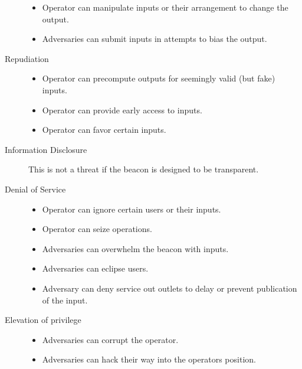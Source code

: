 \begin{description}
    \begin{itemize}
                                    \item Operator can manipulate inputs or their arrangement to change the output.
                                    \item Adversaries can submit inputs in attempts to bias the output.
                                \end{itemize}
    \item [Repudiation] \begin{itemize}
                            \item Operator can precompute outputs for seemingly valid (but fake) inputs.
                            \item Operator can provide early access to inputs.
                            \item Operator can favor certain inputs.
                        \end{itemize}
    \item [Information Disclosure] This is not a threat if the beacon is designed to be transparent.
    \item [Denial of Service] \begin{itemize}
                                \item Operator can ignore certain users or their inputs.
                                \item Operator can seize operations.
                                \item Adversaries can overwhelm the beacon with inputs.
                                \item Adversaries can eclipse users.
                                \item Adversary can deny service out outlets to delay or prevent publication of the input.
                              \end{itemize}
    \item [Elevation of privilege] \begin{itemize}
                                     \item Adversaries can corrupt the operator.
                                     \item Adversaries can hack their way into the operators position.
                                   \end{itemize}
\end{description}


